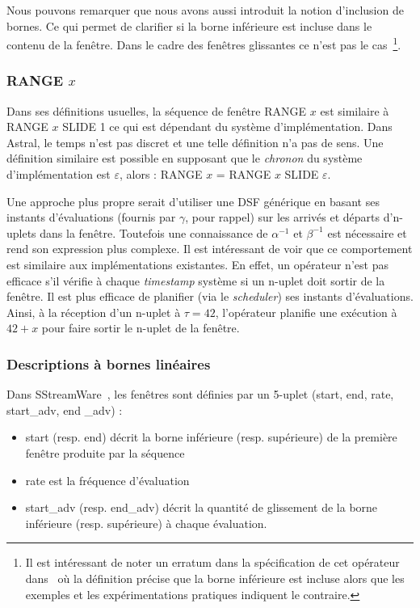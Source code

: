Nous pouvons remarquer que nous avons aussi introduit la notion d'inclusion de bornes. Ce qui permet de clarifier si la borne inférieure est incluse dans le contenu de la fenêtre. Dans le cadre des fenêtres glissantes ce n'est pas le cas~\footnote{Il est intéressant de noter un erratum dans la spécification de cet opérateur dans~\cite{Jain:spread} où la définition précise que la borne inférieure est incluse alors que les exemples et les expérimentations pratiques indiquent le contraire.}.

\subsubsection{RANGE $x$}
Dans ses définitions usuelles, la séquence de fenêtre RANGE $x$ est similaire à RANGE $x$ SLIDE 1 ce qui est dépendant du système d'implémentation. Dans Astral, le temps n'est pas discret et une telle définition n'a pas de sens. Une définition similaire est possible en supposant que le \textit{chronon} du système d'implémentation est $\varepsilon$, alors : RANGE $x$ = RANGE $x$ SLIDE $\varepsilon$.

Une approche plus propre serait d'utiliser une DSF générique en basant ses instants d'évaluations (fournis par $\gamma$, pour rappel) sur les arrivés et départs d'n-uplets dans la fenêtre. Toutefois une connaissance de $\alpha^{-1}$ et $\beta^{-1}$ est nécessaire et rend son expression plus complexe. Il est intéressant de voir que ce comportement est similaire aux implémentations existantes. En effet, un opérateur n'est pas efficace s'il vérifie à chaque \textit{timestamp} système si un n-uplet doit sortir de la fenêtre. Il est plus efficace de planifier (via le \textit{scheduler}) ses instants d'évaluations. Ainsi, à la réception d'un n-uplet à $\tau=42$, l'opérateur planifie une exécution à $42+x$ pour faire sortir le n-uplet de la fenêtre.

\subsubsection{Descriptions à bornes linéaires}
Dans SStreamWare~\cite{Gurgen:sstreamware}, les fenêtres sont définies par un 5-uplet (start, end, rate, start\_adv, end \_adv) :
\begin{itemize}
	\item start (resp. end) décrit la borne inférieure (resp. supérieure) de la première fenêtre produite par la séquence
	\item rate est la fréquence d'évaluation
	\item start\_adv (resp. end\_adv) décrit la quantité de glissement de la borne inférieure (resp. supérieure) à chaque évaluation.
\end{itemize}

